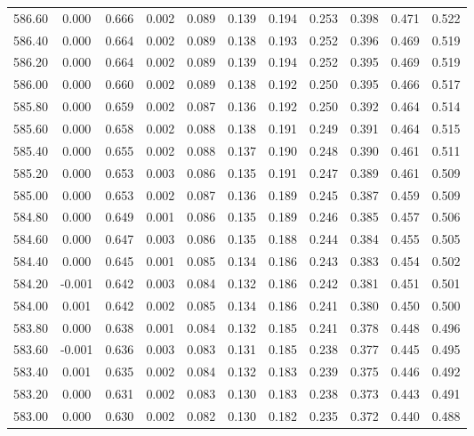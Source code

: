 \begin{longtable}{cccccccccc}
    586.60 &  0.000 &  0.666 &  0.002 &  0.089 &  0.139 &  0.194 &  0.253 &  0.398 &  0.471 &  0.522 \\
    586.40 &  0.000 &  0.664 &  0.002 &  0.089 &  0.138 &  0.193 &  0.252 &  0.396 &  0.469 &  0.519 \\
    586.20 &  0.000 &  0.664 &  0.002 &  0.089 &  0.139 &  0.194 &  0.252 &  0.395 &  0.469 &  0.519 \\
    586.00 &  0.000 &  0.660 &  0.002 &  0.089 &  0.138 &  0.192 &  0.250 &  0.395 &  0.466 &  0.517 \\
    585.80 &  0.000 &  0.659 &  0.002 &  0.087 &  0.136 &  0.192 &  0.250 &  0.392 &  0.464 &  0.514 \\
    585.60 &  0.000 &  0.658 &  0.002 &  0.088 &  0.138 &  0.191 &  0.249 &  0.391 &  0.464 &  0.515 \\
    585.40 &  0.000 &  0.655 &  0.002 &  0.088 &  0.137 &  0.190 &  0.248 &  0.390 &  0.461 &  0.511 \\
    585.20 &  0.000 &  0.653 &  0.003 &  0.086 &  0.135 &  0.191 &  0.247 &  0.389 &  0.461 &  0.509 \\
    585.00 &  0.000 &  0.653 &  0.002 &  0.087 &  0.136 &  0.189 &  0.245 &  0.387 &  0.459 &  0.509 \\
    584.80 &  0.000 &  0.649 &  0.001 &  0.086 &  0.135 &  0.189 &  0.246 &  0.385 &  0.457 &  0.506 \\
    584.60 &  0.000 &  0.647 &  0.003 &  0.086 &  0.135 &  0.188 &  0.244 &  0.384 &  0.455 &  0.505 \\
    584.40 &  0.000 &  0.645 &  0.001 &  0.085 &  0.134 &  0.186 &  0.243 &  0.383 &  0.454 &  0.502 \\
    584.20 & -0.001 &  0.642 &  0.003 &  0.084 &  0.132 &  0.186 &  0.242 &  0.381 &  0.451 &  0.501 \\
    584.00 &  0.001 &  0.642 &  0.002 &  0.085 &  0.134 &  0.186 &  0.241 &  0.380 &  0.450 &  0.500 \\
    583.80 &  0.000 &  0.638 &  0.001 &  0.084 &  0.132 &  0.185 &  0.241 &  0.378 &  0.448 &  0.496 \\
    583.60 & -0.001 &  0.636 &  0.003 &  0.083 &  0.131 &  0.185 &  0.238 &  0.377 &  0.445 &  0.495 \\
    583.40 &  0.001 &  0.635 &  0.002 &  0.084 &  0.132 &  0.183 &  0.239 &  0.375 &  0.446 &  0.492 \\
    583.20 &  0.000 &  0.631 &  0.002 &  0.083 &  0.130 &  0.183 &  0.238 &  0.373 &  0.443 &  0.491 \\
    583.00 &  0.000 &  0.630 &  0.002 &  0.082 &  0.130 &  0.182 &  0.235 &  0.372 &  0.440 &  0.488 \\

\end{longtable}
